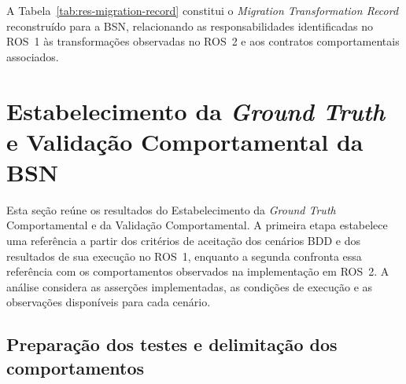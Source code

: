 A Tabela~\ref{tab:res-migration-record} constitui o \textit{Migration Transformation Record} reconstruído para a BSN, relacionando as responsabilidades identificadas no ROS~1 às transformações observadas no ROS~2 e aos contratos comportamentais associados.




\section{Estabelecimento da \textit{Ground Truth} e Validação Comportamental da BSN}
\label{sec:resultados-ground-truth-validacao-bsn}
\label{sec:aplicacao-ground-truth-bsn}
\label{sec:resultados-validacao-bsn}

Esta seção reúne os resultados do Estabelecimento da \textit{Ground Truth} Comportamental e da Validação Comportamental. A primeira etapa estabelece uma referência a partir dos critérios de aceitação dos cenários BDD e dos resultados de sua execução no ROS~1, enquanto a segunda confronta essa referência com os comportamentos observados na implementação em ROS~2. A análise considera as asserções implementadas, as condições de execução e as observações disponíveis para cada cenário.

\subsection{Preparação dos testes e delimitação dos comportamentos}
\label{subsec:gt-validacao-preparacao}


